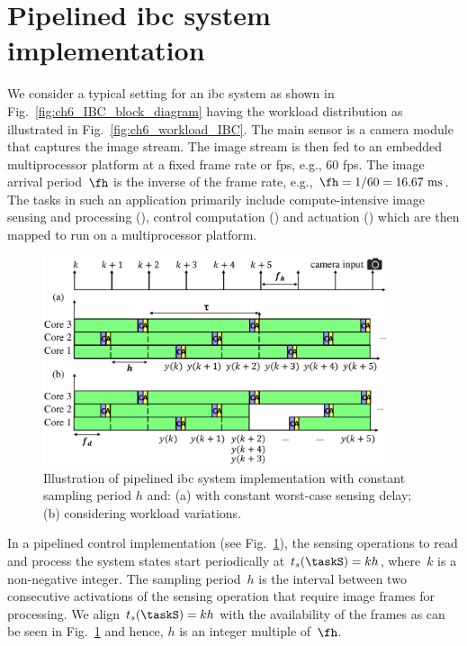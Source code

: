 \section{Pipelined \texorpdfstring{\gls{ibc}}{IBC} system implementation}\label{sec:ch6_pipes}
We consider a typical setting for an \gls{ibc} system as shown in Fig.~\ref{fig:ch6_IBC_block_diagram} having the workload distribution as illustrated in Fig.~\ref{fig:ch6_workload_IBC}. The main sensor is a camera module that captures the image stream. The image stream is then fed to an embedded multiprocessor platform at a fixed frame rate or \gls{fps}, e.g., 60 fps. The image arrival period~$\fh$ is the inverse of the frame rate, e.g., ${\fh=1/60=16.67\text{~ms}}$. 
The tasks in such an application primarily include compute-intensive image sensing and processing (\taskS), control computation (\taskC) and actuation (\taskA) which are then mapped to run on a multiprocessor platform.

\begin{figure}[t]
\centerline{
    \includegraphics[width=0.9\textwidth]{images/pIBC3.eps}
    }
    \caption{Illustration of pipelined \gls{ibc} system implementation with constant sampling period $h$ and: (a) with constant worst-case sensing delay; (b) considering workload variations.}
    \label{fig:ch6_pipelined_IBC}
    \vspace{-1em}
\end{figure}

In a pipelined control implementation (see Fig.~\ref{fig:ch6_pipelined_IBC}), the
sensing operations to read and process the system states start periodically at $t_s(\taskS) = kh$, where~$k$ is a non-negative integer. 
The sampling period~$h$ is the interval between two consecutive activations of the sensing operation that require image frames for processing. 
We align $t_s(\taskS) = kh$ with the availability of the frames as can be seen in Fig.~\ref{fig:ch6_pipelined_IBC} and hence, $h$ is an integer multiple of~$\fh$.

